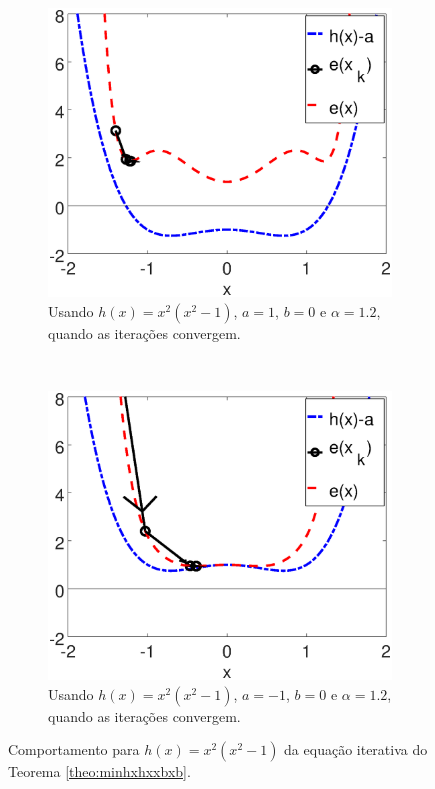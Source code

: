 \begin{figure}[!h]
    \centering
    \begin{subfigure}[b]{0.49\textwidth}
        \includegraphics[width=\textwidth]{chapters/minimization-hx/mfiles/hx_a_alphax/minimizando_hx_a_alphax_1.eps}
        \caption{Usando $h(x)=x^2(x^2-1)$, $a=1$, $b=0$ e $\alpha=1.2$, quando as iterações convergem.}
        \label{fig:hxbcasesa}
    \end{subfigure}
    ~ %
    \begin{subfigure}[b]{0.49\textwidth}
        \includegraphics[width=\textwidth]{chapters/minimization-hx/mfiles/hx_a_alphax/minimizando_hx_a_alphax_2.eps}
        \caption{Usando $h(x)=x^2(x^2-1)$, $a=-1$, $b=0$ e $\alpha=1.2$, quando as iterações convergem.}
        \label{fig:hxbcasesb}
    \end{subfigure}
    \caption{Comportamento para $h(x)=x^2(x^2-1)$ da equação iterativa do Teorema \ref{theo:minhxhxxbxb}.}
    \label{fig:hxbcases}
\end{figure}


